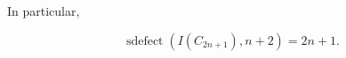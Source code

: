 \documentclass[12pt]{amsart}
\def\sdefect{\operatorname{sdefect}}
\renewcommand{\geq}{\geqslant}
\theoremstyle{plain}
\newtheorem{lem}[theorem]{Lemma}
\theoremstyle{definition}
\begin{document}
In particular, 

\[
	\sdefect(I(C_{2n+1}),n+2) = 2n+1.
\]



%
%
%
%

%



\end{document}
